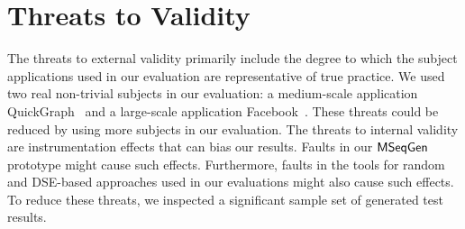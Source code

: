 \section{Threats to Validity}
\label{sec:threats}
The threats to external validity primarily include the degree to which the subject applications used in our evaluation are representative of true practice. We used two real non-trivial subjects in our evaluation: a medium-scale application QuickGraph~\cite{QUICKGRAPH} and a large-scale application Facebook~\cite{FACEBOOK}. These threats could be reduced by using more subjects in our evaluation. The threats to internal validity are instrumentation effects that can bias our results. Faults in our $\textsf{MSeqGen} $ prototype might cause such effects. Furthermore, faults in the tools for random and DSE-based approaches used in our evaluations might also cause such effects. To reduce these threats, we inspected a significant sample set of generated test results.
